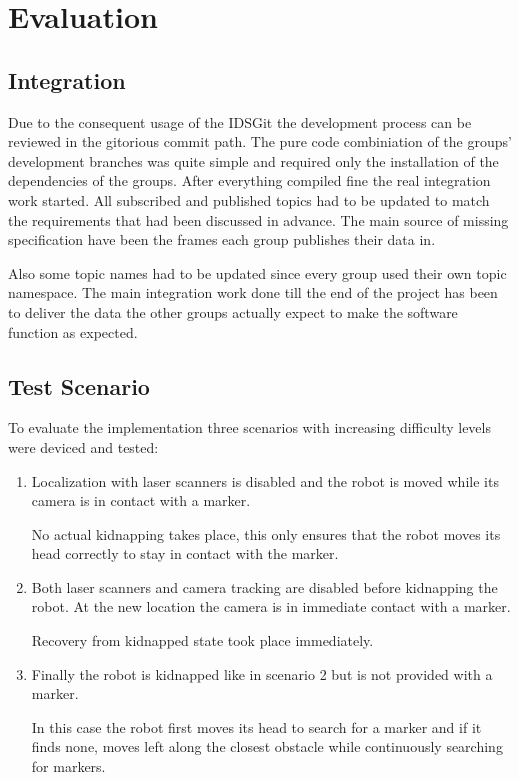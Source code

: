 \chapter{Evaluation}
\section{Integration}
Due to the consequent usage of the IDSGit the development process can be reviewed in the gitorious commit path. The pure code combiniation of the groups' development branches was quite simple and required only the installation of the dependencies of the groups. After everything compiled fine the real integration work started. All subscribed and published topics had to be updated to match the requirements that had been discussed in advance. The main source of missing specification have been the frames each group publishes their data in.

Also some topic names had to be updated since every group used their own topic namespace.
The main integration work done till the end of the project has been to deliver the data the other groups actually expect to make the software function as expected.

\section{Test Scenario}
To evaluate the implementation three scenarios with increasing difficulty levels were deviced and tested:
\begin{enumerate}
\item Localization with laser scanners is disabled and the robot is moved while its camera is in contact with a marker.

No actual kidnapping takes place, this only ensures that the robot moves its head correctly to stay in contact with the marker.

\item Both laser scanners and camera tracking are disabled before kidnapping the robot. At the new location the camera is in immediate contact with a marker. 

Recovery from kidnapped state took place immediately.
\item Finally the robot is kidnapped like in scenario 2 but is not provided with a marker. 

In this case the robot first moves its head to search for a marker and if it finds none, moves left along the closest obstacle while continuously searching for markers.
\end{enumerate}

